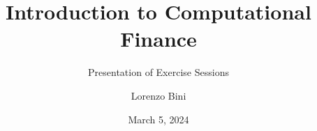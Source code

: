 \documentclass{beamer}
\title{Introduction to Computational Finance}
\subtitle{Presentation of Exercise Sessions}
\author{Lorenzo Bini}
\institute{University of Geneva}
\date{March 5, 2024}
\begin{document}
\begin{frame}
\titlepage
\end{frame}



\end{document}
